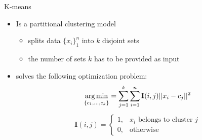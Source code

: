 \begin{frame}{K-means}
\begin{itemize}
\item Is a partitional clustering model
\begin{itemize}
\item splits data $\{x_i\}_1^n$ into $k$ disjoint sets
\item the number of sets $k$ has to be provided as input
\end{itemize}
\item solves the following optimization problem:
\begin{align*}
\operatorname*{arg\,min}_{\{c_1, \ldots, c_k\}} = \sum_{j=1}^k\sum_{i=1}^n \mathbf{I}(i,j)||x_i - c_j ||^2 
\end{align*}
\begin{align*}
\mathbf{I}(i,j)=
\begin{cases}
    1, & \text{$x_i$ belongs to cluster $j$}\\
    0,              & \text{otherwise}
\end{cases}
\end{align*}
\end{itemize}
\end{frame}